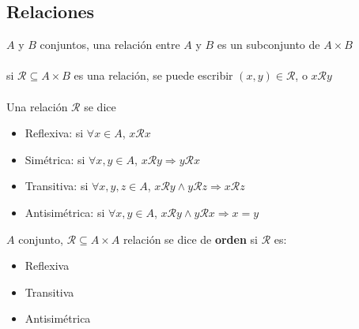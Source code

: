 \documentclass[a4paper,10pt]{article}
\begin{document}
\subsection{Relaciones}


 $A$ y $B$ conjuntos, una relación entre $A$ y $B$ es un subconjunto de $A \times B$ \\ \\
\notacion si $\mathcal{R} \subseteq A \times B$ es una relación, se puede escribir $(x,y) \in \mathcal{R}$, o $x \mathcal{R} y$ \\ \\
 Una relación $\mathcal{R}$ se dice
\begin{itemize}
	\item Reflexiva: si $\forall x \in A$, $x \mathcal{R} x$
	\item Simétrica: si $\forall x,y \in A$, $x \mathcal{R} y \Rightarrow y \mathcal{R} x$
	\item Transitiva: si $\forall x,y,z \in A$, $x \mathcal{R} y \wedge y \mathcal{R} z \Rightarrow x \mathcal{R} z$
	\item Antisimétrica: si $\forall x,y \in A$, $x \mathcal{R} y \wedge y \mathcal{R} x \Rightarrow x = y$
\end{itemize}
 $A$ conjunto, $\mathcal{R} \subseteq A \times A$ relación se dice de \textbf{orden} si $\mathcal{R}$ es:
\begin{itemize}
	\item Reflexiva
	\item Transitiva
	\item Antisimétrica
\end{itemize}
\end{document}
